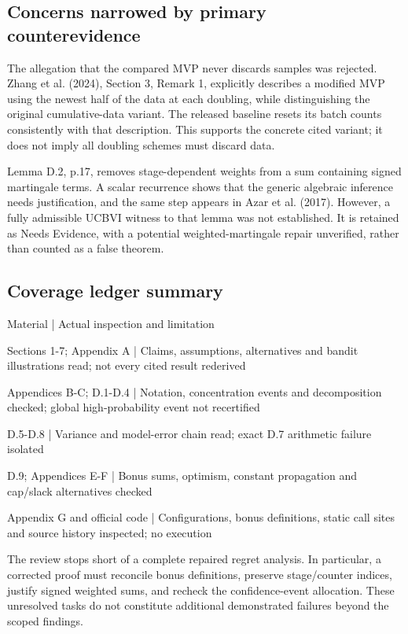 \documentclass[10pt]{article}
\begin{document}
\subsection*{Concerns narrowed by primary counterevidence}
The allegation that the compared MVP never discards samples was rejected. Zhang et al. (2024), Section 3, Remark 1, explicitly describes a modified MVP using the newest half of the data at each doubling, while distinguishing the original cumulative-data variant. The released baseline resets its batch counts consistently with that description. This supports the concrete cited variant; it does not imply all doubling schemes must discard data.\par
Lemma D.2, p.17, removes stage-dependent weights from a sum containing signed martingale terms. A scalar recurrence shows that the generic algebraic inference needs justification, and the same step appears in Azar et al. (2017). However, a fully admissible UCBVI witness to that lemma was not established. It is retained as Needs Evidence, with a potential weighted-martingale repair unverified, rather than counted as a false theorem.\par
\subsection*{Coverage ledger summary}
Material | Actual inspection and limitation\par
Sections 1-7; Appendix A | Claims, assumptions, alternatives and bandit illustrations read; not every cited result rederived\par
Appendices B-C; D.1-D.4 | Notation, concentration events and decomposition checked; global high-probability event not recertified\par
D.5-D.8 | Variance and model-error chain read; exact D.7 arithmetic failure isolated\par
D.9; Appendices E-F | Bonus sums, optimism, constant propagation and cap/slack alternatives checked\par
Appendix G and official code | Configurations, bonus definitions, static call sites and source history inspected; no execution\par
The review stops short of a complete repaired regret analysis. In particular, a corrected proof must reconcile bonus definitions, preserve stage/counter indices, justify signed weighted sums, and recheck the confidence-event allocation. These unresolved tasks do not constitute additional demonstrated failures beyond the scoped findings.\par
\end{document}
